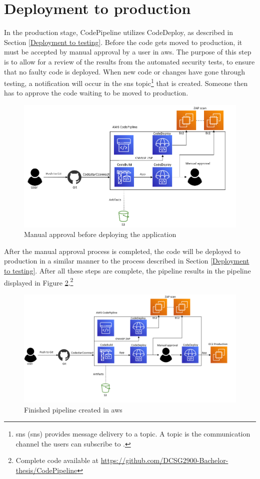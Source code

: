 \section{Deployment to production}
In the production stage, CodePipeline utilizes CodeDeploy, as described in Section \ref{Deployment to testing}. Before the code gets moved to production, it must be accepted by manual approval by a user in \acrshort{aws}. The purpose of this step is to allow for a review of the results from the automated security tests, to ensure that no faulty code is deployed. When new code or changes have gone through testing, a notification will occur in the \acrshort{sns} topic\footnote{\acrlong{sns} (\acrshort{sns}) provides message delivery to a topic. A topic is the communication channel the users can subscribe to \cite{SNStopic}.} that is created. Someone then has to approve the code waiting to be moved to production.

\vspace{2mm}
\begin{figure}[H]
    \centering
    \includegraphics[width=0.8\columnwidth]{Images/aws-piplin-6.png}
    \caption{Manual approval before deploying the application}
    \label{fig: Manual approval before deploying the application}
\end{figure}

After the manual approval process is completed, the code will be deployed to production in a similar manner to the process described in Section \ref{Deployment to testing}. After all these steps are complete, the pipeline results in the pipeline displayed in Figure \ref{fig: Finished pipeline created in AWS}.\footnote{Complete code available at \url{https://github.com/DCSG2900-Bachelor-thesis/CodePipeline}}

\vspace{2mm}
\begin{figure}[H]
    \centering
    \includegraphics[width=0.8\columnwidth]{Images/aws-piplin-7.png}
    \caption{Finished pipeline created in \acrshort{aws}}
    \label{fig: Finished pipeline created in AWS}
\end{figure}